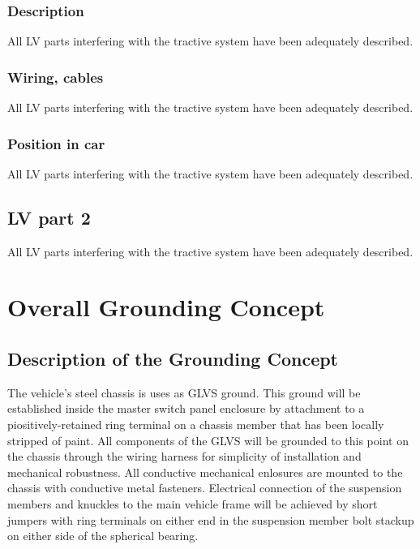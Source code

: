 \documentclass{article}
\begin{document}
\subsubsection{Description}
All LV parts interfering with the tractive system have been adequately described. 

\subsubsection*{Wiring, cables}
All LV parts interfering with the tractive system have been adequately described. 

\subsubsection{Position in car}
All LV parts interfering with the tractive system have been adequately described. 

\subsection{LV part 2}
All LV parts interfering with the tractive system have been adequately described. 

\section{Overall Grounding Concept}\label{overall_grounding_concept}
\subsection{Description of the Grounding Concept}
The vehicle's steel chassis is uses as GLVS ground. This ground will be established inside the master switch panel enclosure by attachment to a piositively-retained ring terminal on a chassis member that has been locally stripped of paint. All components of the GLVS will be grounded to this point on the chassis through the wiring harness for simplicity of installation and mechanical robustness. All conductive mechanical enlosures are mounted to the chassis with conductive metal fasteners. Electrical connection of the suspension members and knuckles to the main vehicle frame will be achieved by short jumpers with ring terminals on either end in the suspension member bolt stackup on either side of the spherical bearing.
\end{document}
